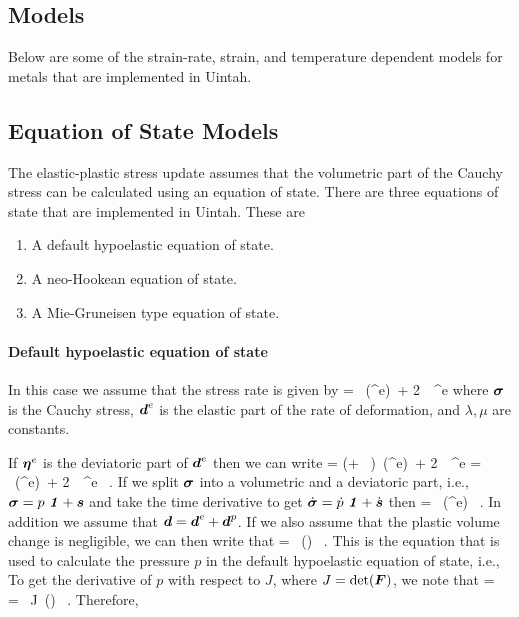 \subsection{Models}
  Below are some of the strain-rate, strain, and temperature dependent models 
  for metals that are implemented in Uintah.

\subsection{Equation of State Models}
The elastic-plastic stress update assumes that the volumetric part of the 
Cauchy stress can be calculated using an equation of state.  There are 
three equations of state that are implemented in Uintah.  These are
\begin{enumerate}
    \item A default hypoelastic equation of state.
    \item A neo-Hookean equation of state.    
    \item A Mie-Gruneisen type equation of state.
\end{enumerate}

\paragraph{Default hypoelastic equation of state}
In this case we assume that the stress rate is given by
\Beq
    \dot{\Bsig} = \lambda~\Tr(\Bd^e)~\Bone + 2~\mu~\Bd^e
\Eeq
where $\Bsig$ is the Cauchy stress, $\Bd^e$ is the elastic part of
the rate of deformation, and $\lambda, \mu$ are constants.

If $\Beta^e$ is the deviatoric part of $\Bd^e$ then we can write
\Beq
    \dot{\Bsig} = \left(\lambda + ~\mu\right)~\Tr(\Bd^e)~\Bone + 
        2~\mu~\Beta^e = \kappa~\Tr(\Bd^e)~\Bone + 2~\mu~\Beta^e ~.
\Eeq
If we split $\Bsig$ into a volumetric and a deviatoric part, i.e.,
$\Bsig = p~\Bone + \Bs$ and take the time derivative to get
$\dot{\Bsig} = \dot{p}~\Bone + \dot{\Bs}$ then
\Beq
     = \kappa~\Tr(\Bd^e) ~.
\Eeq
In addition we assume that $\Bd = \Bd^e + \Bd^p$.  If we also assume that 
the plastic volume change is negligible, we can then write that
\Beq
     = \kappa~\Tr(\Bd) ~.
\Eeq
This is the equation that is used to calculate the pressure $p$ in the 
default hypoelastic equation of state, i.e.,
\Beq
\Eeq
To get the derivative of $p$ with respect to $J$, where $J = \det(\BF)$,
we note that
\Beq
     = ~ = ~J~\Tr(\Bd) ~.
\Eeq
Therefore,
\Beq
\Eeq

